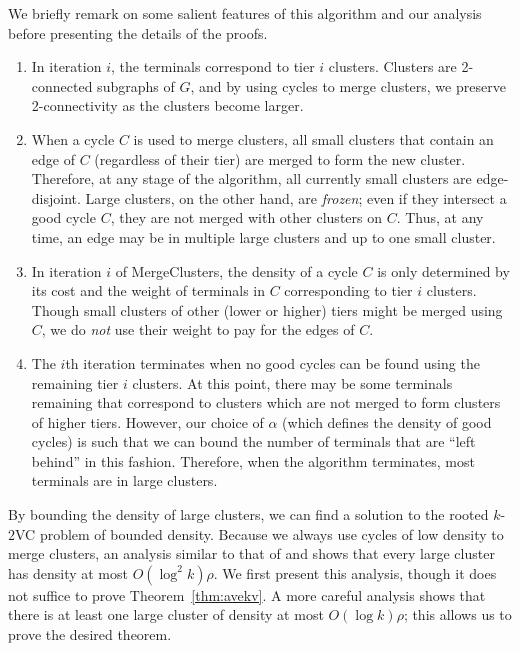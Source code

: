 \documentclass[11pt]{article}
\newcommand{\kvc}[1]{$k$-$#1${\sc VC} }
\newcommand{\kv}{\kvc{2}}
\begin{document}
We briefly remark on some salient features of this algorithm and our
analysis before presenting the details of the proofs.
\begin{enumerate}
\item In iteration $i$, the terminals correspond to tier $i$
  clusters. Clusters are 2-connected subgraphs of $G$, and by using
  cycles to merge clusters, we preserve 2-connectivity as the clusters
  become larger.

\item When a cycle $C$ is used to merge clusters, all small clusters
  that contain an edge of $C$ (regardless of their tier) are merged to
  form the new cluster. Therefore, at any stage of the algorithm, all
  currently small clusters are edge-disjoint.  Large clusters, on the
  other hand, are \emph{frozen}; even if they intersect a good cycle
  $C$, they are not merged with other clusters on $C$. Thus, at any
  time, an edge may be in multiple large clusters and up to one small
  cluster.

\item In iteration $i$ of {\sc MergeClusters}, the density of a cycle
  $C$ is only determined by its cost and the weight of terminals in
  $C$ corresponding to tier $i$ clusters. Though small clusters of
  other (lower or higher) tiers might be merged using $C$, we do
  \emph{not} use their weight to pay for the edges of $C$.

\item The $i$th iteration terminates when no good cycles can be found
  using the remaining tier $i$ clusters. At this point, there may be
  some terminals remaining that correspond to clusters which are not
  merged to form clusters of higher tiers. However, our choice of
  $\alpha$ (which defines the density of good cycles) is such that we
  can bound the number of terminals that are ``left behind'' in this
  fashion. Therefore, when the algorithm terminates, most terminals
  are in large clusters.
\end{enumerate}

By bounding the density of large clusters, we can find a solution to
the rooted \kv problem of bounded density. Because we always use
cycles of low density to merge clusters, an analysis similar to that
of \cite{LauNSS07} and \cite{ChekuriKP08} shows that every large
cluster has density at most $O(\log^2 k) \rho$. We first present this
analysis, though it does not suffice to prove Theorem~\ref{thm:avekv}.
A more careful analysis shows that there is at least one large cluster
of density at most $O(\log k) \rho$; this allows us to prove the
desired theorem.
\end{document}

